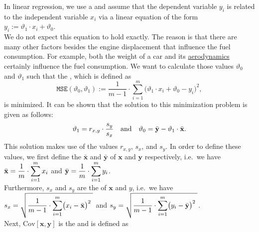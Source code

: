 In linear regression, we use a  
and assume that the dependent variable $y_i$ is related to the independent variable $x_i$ via a linear
equation of the form
\\[0.2cm]
\hspace*{1.3cm}
$y_i := \vartheta_1 \cdot x_i + \vartheta_0$.
\\[0.2cm]
We do not expect this equation to hold exactly.  The reason is that there are many other factors besides the
engine displacement that influence the fuel consumption.  For example, both the weight of a car and its 
\href{https://en.wikipedia.org/wiki/Automotive_aerodynamics}{aerodynamics} certainly influence the fuel consumption.  
We want to calculate those values $\vartheta_0$ and $\vartheta_1$ such that the 
, which is defined as 
\begin{equation}
  \label{eq:mse}
 \mathtt{MSE}(\vartheta_0, \vartheta_1) := \frac{1}{m-1} \cdot \sum\limits_{i=1}^m \bigl(\vartheta_1 \cdot x_i + \vartheta_0 - y_i\bigr)^2,
\end{equation}
is minimized.  It can be shown that the solution to this minimization problem is given as follows:
\begin{equation}
  \label{eq:theta0}
  \displaystyle \vartheta_1 = r_{x,y} \cdot \frac{s_y}{s_x} \quad \mbox{and} \quad
      \vartheta_0 = \bar{\mathbf{y}} - \vartheta_1 \cdot \bar{\mathbf{x}}.
\end{equation}
This solution makes use of the values $r_{x,y}$, $s_x$, and $s_y$.  In order to define these values, we first
define the  $\bar{\mathbf{x}}$ and $\bar{\mathbf{y}}$ of $\mathbf{x}$ and $\mathbf{y}$ respectively, i.e.~we have 
\\[0.2cm]
\hspace*{1.3cm}
$\displaystyle \bar{\mathbf{x}} = \frac{1}{m} \cdot \sum\limits_{i=1}^m x_i$ \quad and \quad
$\displaystyle \bar{\mathbf{y}} = \frac{1}{m} \cdot \sum\limits_{i=1}^m y_i$.
\\[0.2cm]
Furthermore, $s_x$ and $s_y$ are the  of $\mathbf{x}$ and $y$, i.e.~we have
\\[0.2cm]
\hspace*{1.3cm}
$\displaystyle s_x = \sqrt{\frac{1}{m-1} \cdot \sum\limits_{i=1}^m \bigl(x_i - \bar{\mathbf{x}}\bigr)^2\;}$ \quad and \quad
$\displaystyle s_y = \sqrt{\frac{1}{m-1} \cdot \sum\limits_{i=1}^m \bigl(y_i - \bar{\mathbf{y}}\bigr)^2\;}$.
\\[0.2cm]
Next, $\mathrm{Cov}[\mathbf{x}, \mathbf{y}]$ is the  and is defined as 
